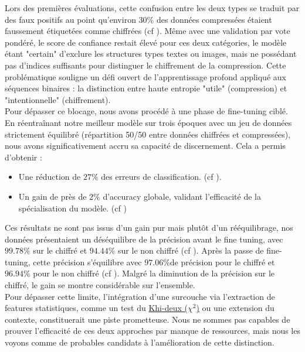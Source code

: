 \documentclass[12pt]{report}
\begin{document}
    Lors des premières évaluations, cette confusion entre les deux types se traduit par des faux positifs au point qu'environ $30\%$ des données compressées étaient faussement étiquetées comme chiffrées (cf ). Même avec une validation par vote pondéré, le score de confiance restait élevé pour ces deux catégories, le modèle étant "certain" d'exclure les structures types textes ou images, mais ne possédant pas d'indices suffisants pour distinguer le chiffrement de la compression. Cette problématique souligne un défi ouvert de l'apprentissage profond appliqué aux séquences binaires : la distinction entre haute entropie "utile" (compression) et "intentionnelle" (chiffrement).\\

    Pour dépasser ce blocage, nous avons procédé à une phase de fine-tuning ciblé. En réentraînant notre meilleur modèle sur trois époques avec un jeu de données strictement équilibré (répartition 50/50 entre données chiffrées et compressées), nous avons significativement accru sa capacité de discernement. Cela a permis d'obtenir :

    \begin{itemize}
        \item Une réduction de $27\%$ des erreurs de classification. (cf ).
        \item Un gain de près de $2\%$ d'accuracy globale, validant l'efficacité de la spécialisation du modèle. (cf )
    \end{itemize}

    Ces résultats ne sont pas issus d'un gain pur mais plutôt d'un rééquilibrage, nos données présentaient un déséquilibre de la précision avant le fine tuning, avec $99.78\%$ sur le chiffré et $94.44\%$ sur le non chiffré (cf ). Après la passe de fine-tuning, cette précision s'équilibre avec $97.06\%$de précision pour le chiffré et $96.94\%$ pour le non chiffré (cf ). Malgré la diminution de la précision sur le chiffré, le gain se montre considérable sur l'ensemble.\\

    Pour dépasser cette limite, l'intégration d'une surcouche via l'extraction de features statistiques, comme un test du \href{https://fr.wikipedia.org/wiki/Test_du_%CF%87%C2%B2}{Khi-deux ($\chi^2$)} ou une extension du contexte, constituerait une piste prometteuse. Nous ne sommes pas capables de prouver l'efficacité de ces deux approches par manque de ressources, mais nous les voyons comme de probables candidats à l'amélioration de cette distinction.\\
\end{document}
